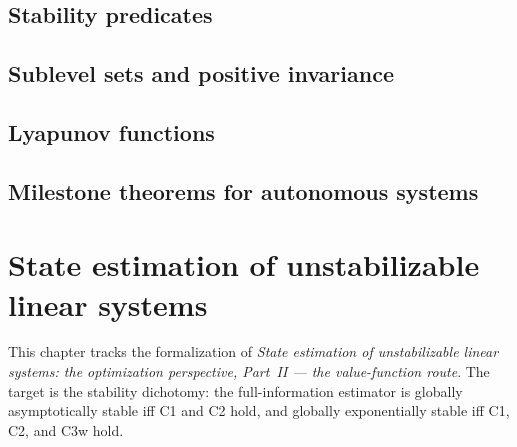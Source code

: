 \section{Stability predicates}




\section{Sublevel sets and positive invariance}





\section{Lyapunov functions}






\section{Milestone theorems for autonomous systems}





\chapter{State estimation of unstabilizable linear systems}

This chapter tracks the formalization of \emph{State estimation of
unstabilizable linear systems: the optimization perspective, Part~II --- the
value-function route}. The target is the stability dichotomy: the
full-information estimator is globally asymptotically stable iff C1 and C2
hold, and globally exponentially stable iff C1, C2, and C3w hold.

